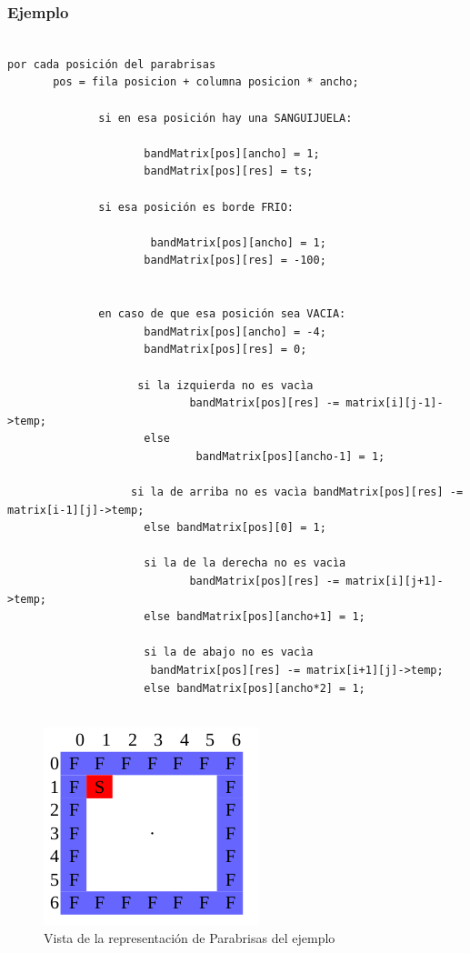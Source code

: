 \subsubsection{Ejemplo}
\begin{verbatim}

por cada posición del parabrisas
       pos = fila posicion + columna posicion * ancho;
		
              si en esa posición hay una SANGUIJUELA:
			
                     bandMatrix[pos][ancho] = 1;
                     bandMatrix[pos][res] = ts;
		
              si esa posición es borde FRIO:
                    
                      bandMatrix[pos][ancho] = 1;
                     bandMatrix[pos][res] = -100;


              en caso de que esa posición sea VACIA:
                     bandMatrix[pos][ancho] = -4;
                     bandMatrix[pos][res] = 0;
                    
                    si la izquierda no es vacìa
                            bandMatrix[pos][res] -= matrix[i][j-1]->temp;
                     else
                             bandMatrix[pos][ancho-1] = 1;

                   si la de arriba no es vacìa bandMatrix[pos][res] -= matrix[i-1][j]->temp;
                     else bandMatrix[pos][0] = 1;

                     si la de la derecha no es vacìa
                            bandMatrix[pos][res] -= matrix[i][j+1]->temp;
                     else bandMatrix[pos][ancho+1] = 1;
                     
                     si la de abajo no es vacìa
                      bandMatrix[pos][res] -= matrix[i+1][j]->temp;
                     else bandMatrix[pos][ancho*2] = 1;
		

\end{verbatim}
\begin{figure}[htb]
\begin{center}
\includegraphics[scale=0.70]{imagenes/parabrisasej.png} 
\caption{Vista de la representación de Parabrisas del ejemplo} 
\end{center}
\end{figure}

